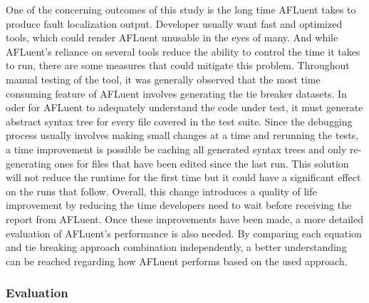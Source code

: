 One of the concerning outcomes of this study is the long time AFLuent takes to
produce fault localization output. Developer usually want fast and optimized
tools, which could render AFLuent unusable in the eyes of many. And while
AFLuent's reliance on several tools reduce the ability to control the time it
takes to run, there are some measures that could mitigate this problem.
Throughout manual testing of the tool, it was generally observed that the most
time consuming feature of AFLuent involves generating the tie breaker datasets.
In oder for AFLuent to adequately understand the code under test, it must
generate abstract syntax tree for every file covered in the test suite. Since
the debugging process usually involves making small changes at a time and
rerunning the tests, a time improvement is possible be caching all generated
syntax trees and only re-generating ones for files that have been edited since
the last run. This solution will not reduce the runtime for the first time but
it could have a significant effect on the runs that follow. Overall, this change
introduces a quality of life improvement by reducing the time developers need to
wait before receiving the report from AFLuent. Once these improvements have been
made, a more detailed evaluation of AFLuent's performance is also needed. By
comparing each equation and tie breaking approach combination independently, a
better understanding can be reached regarding how AFLuent performs based on the
used approach.

\subsubsection{Evaluation}

